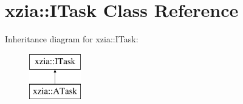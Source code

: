 \hypertarget{classxzia_1_1ITask}{}\section{xzia\+:\+:I\+Task Class Reference}
\label{classxzia_1_1ITask}
Inheritance diagram for xzia\+:\+:I\+Task\+:\begin{figure}[H]
\begin{center}
\leavevmode
\includegraphics[height=2.000000cm]{classxzia_1_1ITask}
\end{center}
\end{figure}
